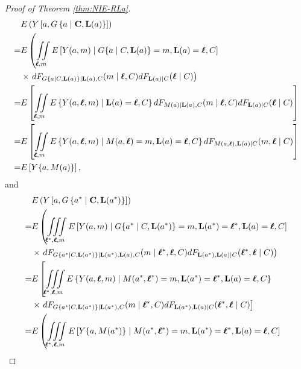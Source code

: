 \documentclass[12pt]{article}
\begin{document}
\begin{proof}[Proof of Theorem \ref{thm:NIE-RLa}]
    \begin{align*}
        &E\left(Y\left[a,G\left\{a\mid {\bf C}, {\bf L}(a)\right\}\right]\right)\\
        =& E\left(\iint\limits_{{\boldsymbol \ell},m}E\left[Y(a,m)\mid G\{a\mid C,{\bf L}(a)\}=m,{\bf L}(a)={\boldsymbol \ell}, C\right]\right.\\
        &\times \left.dF_{G\{a\mid C,{\bf L}(a)\}\mid {\bf L}(a),C}(m\mid {\boldsymbol \ell},C)dF_{{\bf L}(a)\mid C}({\boldsymbol \ell}\mid C)\right)\\
        =& E\left[\iint\limits_{{\boldsymbol \ell},m}E\left\{Y(a,{\boldsymbol \ell},m)\mid {\bf L}(a)={\boldsymbol \ell}, C\right\}dF_{M(a)\mid {\bf L}(a),C}(m\mid {\boldsymbol \ell},C)dF_{{\bf L}(a)\mid C}({\boldsymbol \ell}\mid C)\right]\\
        =& E\left[\iint\limits_{{\boldsymbol \ell},m}E\left\{Y(a,{\boldsymbol \ell},m)\mid M(a,{\boldsymbol \ell})=m, {\bf L}(a)={\boldsymbol \ell}, C\right\}dF_{M(a,{\boldsymbol \ell}), {\bf L}(a)\mid C}(m, {\boldsymbol \ell}\mid C)\right]\\
        =& E\left[Y\{a,M(a)\}\right],
    \end{align*}
    and
    \begin{align*}
        &E\left(Y\left[a,G\left\{a^*\mid {\bf C}, {\bf L}(a^*)\right\}\right]\right)\\
        =& E\left(\iiint\limits_{{\boldsymbol \ell^*},{\boldsymbol \ell},m}E\left[Y(a,m)\mid G\{a^*\mid C,{\bf L}(a^*)\}=m,{\bf L}(a^*)={\boldsymbol \ell^*}, {\bf L}(a)={\boldsymbol \ell}, C\right]\right.\\
        &\times \left.dF_{G\{a^*\mid C,{\bf L}(a^*)\}\mid {\bf L}(a^*),{\bf L}(a),C}(m\mid {\boldsymbol \ell^*},{\boldsymbol \ell},C)dF_{{\bf L}(a^*),{\bf L}(a)\mid C}({\boldsymbol \ell^*},{\boldsymbol \ell}\mid C)\right)\\
        =& E\left[\iiint\limits_{{\boldsymbol \ell^*},{\boldsymbol \ell},m}E\left\{Y(a,{\boldsymbol \ell},m)\mid M(a^*,{\boldsymbol \ell^*})=m,{\bf L}(a^*)={\boldsymbol \ell^*}, {\bf L}(a)={\boldsymbol \ell}, C\right\}\right.\\
        &\times \left.dF_{G\{a^*\mid C,{\bf L}(a^*)\}\mid {\bf L}(a^*),C}(m\mid {\boldsymbol \ell^*},C)dF_{{\bf L}(a^*),{\bf L}(a)\mid C}({\boldsymbol \ell^*},{\boldsymbol \ell}\mid C)\right]\\
        =& E\left(\iiint\limits_{{\boldsymbol \ell^*},{\boldsymbol \ell},m}E\left[Y\{a,M(a^*)\}\mid M(a^*,{\boldsymbol \ell^*})=m,{\bf L}(a^*)={\boldsymbol \ell^*}, {\bf L}(a)={\boldsymbol \ell}, C\right]\right.\\

\end{align*}
\end{proof}
\end{document}
